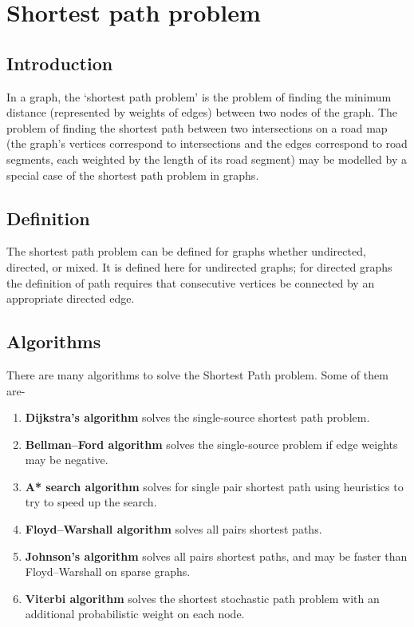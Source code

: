 \section{Shortest path problem}
\subsection{Introduction}
In a graph, the `shortest path problem' is the problem of finding the minimum distance (represented by weights of edges) between two nodes of the graph.
The problem of finding the shortest path between two intersections on a road map (the graph's vertices correspond to intersections and the edges correspond to road segments, each weighted by the length of its road segment) may be modelled by a special case of the shortest path problem in graphs.
\subsection{Definition}
The shortest path problem can be defined for graphs whether undirected, directed, or mixed. It is defined here for undirected graphs; for directed graphs the definition of path requires that consecutive vertices be connected by an appropriate directed edge.\cite{dijkstra}
\subsection{Algorithms}
There are many algorithms to solve the Shortest Path problem. Some of them are-
\begin{enumerate}
	\item{\textbf{Dijkstra's algorithm} solves the single-source shortest path problem.}
	\item{\textbf{Bellman–Ford algorithm} solves the single-source problem if edge weights may be negative.}
	\item{\textbf{A* search algorithm} solves for single pair shortest path using heuristics to try to speed up the search.}
	\item{\textbf{Floyd–Warshall algorithm} solves all pairs shortest paths.}
	\item{\textbf{Johnson's algorithm} solves all pairs shortest paths, and may be faster than Floyd–Warshall on sparse graphs.}
	\item{\textbf{Viterbi algorithm} solves the shortest stochastic path problem with an additional probabilistic weight on each node.}
\end{enumerate}